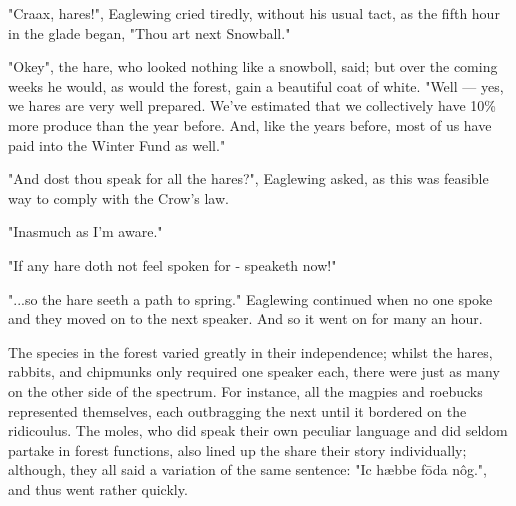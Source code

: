 "Craax, hares!", Eaglewing cried tiredly, without his usual tact, as the fifth hour in the glade began, "Thou art next Snowball."


"Okey", the hare, who looked nothing like a snowboll, said; but over the coming weeks he would, as would the forest, gain a beautiful coat of white. "Well — yes, we hares are very well prepared. We've estimated that we collectively have 10\% more produce than the year before. And, like the years before, most of us have paid into the Winter Fund as well."

"And dost thou speak for all the hares?", Eaglewing asked, as this was feasible way to comply with the Crow's law.

"Inasmuch as I'm aware."

"If any hare doth not feel spoken for - speaketh now!"

"...so the hare seeth a path to spring." Eaglewing continued when no one spoke and they moved on to the next speaker. And so it went on for many an hour. 

The species in the forest varied greatly in their independence; whilst the hares, rabbits, and chipmunks only required one speaker each, there were just as many on the other side of the spectrum. For instance, all the magpies and roebucks represented themselves, each outbragging the next until it bordered on the ridicoulus. The moles, who did speak their own peculiar language and did seldom partake in forest functions, also lined up the share their story individually; although, they all said a variation of the same sentence: "Ic hæbbe fōda nôg.", and thus went rather quickly.




